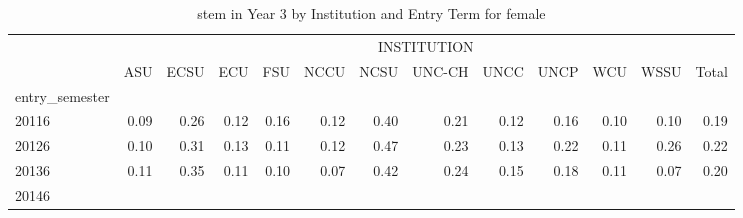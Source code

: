 \begin{table}[!h]
\caption{stem in Year 3 by Institution and Entry Term for female}
\centering
\begin{tabular}{lllllllllllll}
\cline{1-13}
\multicolumn{1}{c}{} &
  \multicolumn{12}{|c}{INSTITUTION} \\
\multicolumn{1}{c}{} &
  \multicolumn{1}{|r}{ASU} &
  \multicolumn{1}{r}{ECSU} &
  \multicolumn{1}{r}{ECU} &
  \multicolumn{1}{r}{FSU} &
  \multicolumn{1}{r}{NCCU} &
  \multicolumn{1}{r}{NCSU} &
  \multicolumn{1}{r}{UNC-CH} &
  \multicolumn{1}{r}{UNCC} &
  \multicolumn{1}{r}{UNCP} &
  \multicolumn{1}{r}{WCU} &
  \multicolumn{1}{r}{WSSU} &
  \multicolumn{1}{r}{Total} \\
\cline{1-13}
\multicolumn{1}{l}{entry\_semester} &
  \multicolumn{1}{|r}{} &
  \multicolumn{1}{r}{} &
  \multicolumn{1}{r}{} &
  \multicolumn{1}{r}{} &
  \multicolumn{1}{r}{} &
  \multicolumn{1}{r}{} &
  \multicolumn{1}{r}{} &
  \multicolumn{1}{r}{} &
  \multicolumn{1}{r}{} &
  \multicolumn{1}{r}{} &
  \multicolumn{1}{r}{} &
  \multicolumn{1}{r}{} \\
\multicolumn{1}{l}{\hspace{1em}20116} &
  \multicolumn{1}{|r}{0.09} &
  \multicolumn{1}{r}{0.26} &
  \multicolumn{1}{r}{0.12} &
  \multicolumn{1}{r}{0.16} &
  \multicolumn{1}{r}{0.12} &
  \multicolumn{1}{r}{0.40} &
  \multicolumn{1}{r}{0.21} &
  \multicolumn{1}{r}{0.12} &
  \multicolumn{1}{r}{0.16} &
  \multicolumn{1}{r}{0.10} &
  \multicolumn{1}{r}{0.10} &
  \multicolumn{1}{r}{0.19} \\
\multicolumn{1}{l}{\hspace{1em}20126} &
  \multicolumn{1}{|r}{0.10} &
  \multicolumn{1}{r}{0.31} &
  \multicolumn{1}{r}{0.13} &
  \multicolumn{1}{r}{0.11} &
  \multicolumn{1}{r}{0.12} &
  \multicolumn{1}{r}{0.47} &
  \multicolumn{1}{r}{0.23} &
  \multicolumn{1}{r}{0.13} &
  \multicolumn{1}{r}{0.22} &
  \multicolumn{1}{r}{0.11} &
  \multicolumn{1}{r}{0.26} &
  \multicolumn{1}{r}{0.22} \\
\multicolumn{1}{l}{\hspace{1em}20136} &
  \multicolumn{1}{|r}{0.11} &
  \multicolumn{1}{r}{0.35} &
  \multicolumn{1}{r}{0.11} &
  \multicolumn{1}{r}{0.10} &
  \multicolumn{1}{r}{0.07} &
  \multicolumn{1}{r}{0.42} &
  \multicolumn{1}{r}{0.24} &
  \multicolumn{1}{r}{0.15} &
  \multicolumn{1}{r}{0.18} &
  \multicolumn{1}{r}{0.11} &
  \multicolumn{1}{r}{0.07} &
  \multicolumn{1}{r}{0.20} \\
\multicolumn{1}{l}{\hspace{1em}20146} &

\end{tabular}
\end{table}
